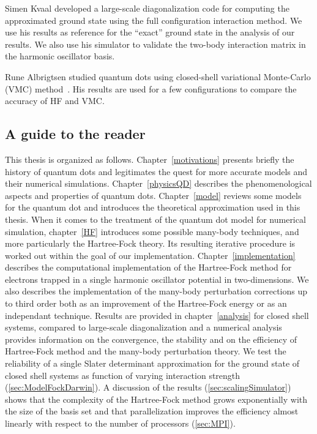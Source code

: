 Simen Kvaal developed a large-scale diagonalization code \cite{Kvaal2008} for computing the approximated ground state using the full configuration interaction method. We use his results as reference for the ``exact'' ground state in the analysis of our results.
We also use his simulator to validate the two-body interaction matrix in the harmonic oscillator basis.

Rune Albrigtsen studied quantum dots using closed-shell variational Monte-Carlo (VMC) method~\cite{Albrigtsen2009}. His results are used for a few configurations to compare the accuracy of HF and VMC.

\subsection{A guide to the reader}
This thesis is organized as follows. Chapter~\ref{motivations} presents briefly the history of quantum dots and legitimates the quest for more accurate models and their numerical simulations. Chapter~\ref{physicsQD} %
describes the phenomenological aspects and properties of quantum dots.
Chapter~\ref{model} reviews some models for the quantum dot and introduces the theoretical approximation used in this thesis. When it comes to the treatment of the quantum dot model for numerical simulation, chapter~\ref{HF} introduces some possible many-body techniques, and more particularly the Hartree-Fock theory. Its resulting iterative procedure is worked out within the goal of our implementation.
Chapter~\ref{implementation} describes the computational implementation of the Hartree-Fock method for electrons trapped in a single harmonic oscillator potential in two-dimensions. We also describes the implementation of the many-body perturbation corrections up to third order both as an improvement of the Hartree-Fock energy or as an independant technique.
Results are provided in chapter~\ref{analysis} for closed shell systems, compared to large-scale diagonalization and a numerical analysis provides information on the convergence, the stability and on the efficiency of Hartree-Fock method and the many-body perturbation theory.
We test the reliability of a single Slater determinant approximation for the ground state of closed shell systems as function of varying interaction strength (\ref{sec:ModelFockDarwin}).
A discussion of the results (\ref{sec:scalingSimulator}) shows that the complexity of the Hartree-Fock method grows exponentially with the size of the basis set and that parallelization improves the efficiency almost linearly with respect to the number of processors (\ref{sec:MPI}).
